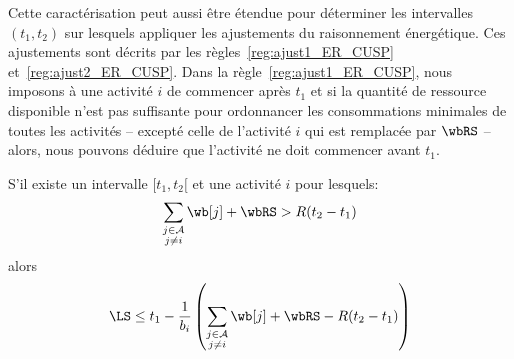 Cette caractérisation peut aussi être étendue pour déterminer les
intervalles $(t_1,t_2)$ sur lesquels appliquer les ajustements du
raisonnement énergétique. Ces ajustements sont décrits par les 
règles~\ref{reg:ajust1_ER_CUSP} et~\ref{reg:ajust2_ER_CUSP}.  Dans la
règle~\ref{reg:ajust1_ER_CUSP}, nous imposons à une activité $i$ de
commencer après $t_1$ et si la quantité de ressource
disponible n'est pas suffisante pour ordonnancer les consommations
minimales de toutes les activités -- excepté celle de l'activité $i$
qui est remplacée par $\wbRS$ -- alors, nous pouvons déduire que
l'activité ne doit commencer avant $t_1$.

\begin{reg}
  \label{reg:ajust1_ER_CUSP}
  S'il existe un intervalle $[t_1,t_2[$ et une activité $i$ pour lesquels:
  \[ \sum_{\substack{j \in \A \\ j \neq i}} \wb[j] + \wbRS > R (t_2-t_1)\]
  alors 
  \[  \LS \le t_1 - \frac{1}{b_i} \left( \sum_{\substack{j \in \A \\ j
          \neq i}} \wb[j] + \wbRS - R (t_2-t_1) \right) \]
\end{reg}

